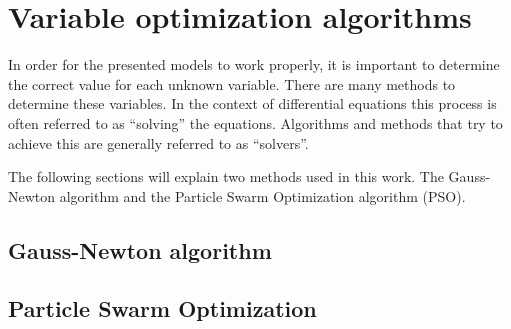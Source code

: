 
\section{Variable optimization algorithms}
In order for the presented models to work properly, it is important to determine the correct value for each unknown variable. There are many
methods to determine these variables. In the context of differential equations this process is often referred to as ``solving'' the equations.
Algorithms and methods that try to achieve this are generally referred to as ``solvers''.\newline

\par
The following sections will explain two methods used in this work. The Gauss-Newton algorithm and the Particle Swarm Optimization algorithm (PSO).


\subsection{Gauss-Newton algorithm}
\label{sec:Gauss}


\subsection{Particle Swarm Optimization}
\label{sec:PSO}
